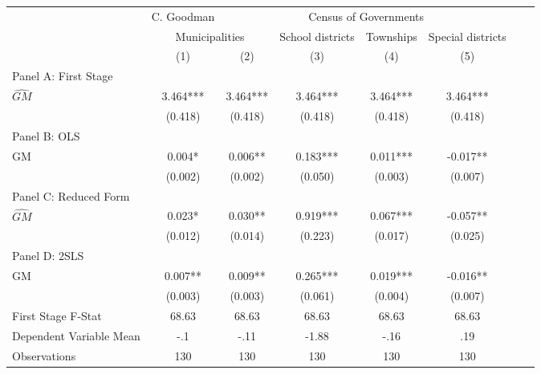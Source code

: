   \begin{tabular}{l*{7}{c}} \toprule
&\multicolumn{1}{c}{C. Goodman}&\multicolumn{4}{c}{Census of Governments}\\\cmidrule(lr){2-2}\cmidrule(lr){3-6}
&\multicolumn{2}{c}{Municipalities}&\multicolumn{1}{c}{School districts}&\multicolumn{1}{c}{Townships}&\multicolumn{1}{c}{Special districts}\\\cmidrule(lr){2-3}\cmidrule(lr){4-6}
&\multicolumn{1}{c}{(1)}&\multicolumn{1}{c}{(2)}&\multicolumn{1}{c}{(3)}&\multicolumn{1}{c}{(4)}&\multicolumn{1}{c}{(5)}\\
\cmidrule(lr){1-6}
\multicolumn{5}{l}{Panel A: First Stage}\\
\cmidrule(lr){1-6}
$\widehat{GM}$  &    3.464***&    3.464***&    3.464***&    3.464***&    3.464***\\
                &  (0.418)   &  (0.418)   &  (0.418)   &  (0.418)   &  (0.418)   \\
\cmidrule(lr){1-6}
\multicolumn{5}{l}{Panel B: OLS}\\
\cmidrule(lr){1-6}
GM              &    0.004*  &    0.006** &    0.183***&    0.011***&   -0.017** \\
                &  (0.002)   &  (0.002)   &  (0.050)   &  (0.003)   &  (0.007)   \\
\cmidrule(lr){1-6}
\multicolumn{5}{l}{Panel C: Reduced Form}\\
\cmidrule(lr){1-6}
$\widehat{GM}$  &    0.023*  &    0.030** &    0.919***&    0.067***&   -0.057** \\
                &  (0.012)   &  (0.014)   &  (0.223)   &  (0.017)   &  (0.025)   \\
\cmidrule(lr){1-6}
\multicolumn{5}{l}{Panel D: 2SLS}\\
\cmidrule(lr){1-6}
GM              &    0.007** &    0.009** &    0.265***&    0.019***&   -0.016** \\
                &  (0.003)   &  (0.003)   &  (0.061)   &  (0.004)   &  (0.007)   \\
\midrule
First Stage F-Stat&    68.63   &    68.63   &    68.63   &    68.63   &    68.63   \\
Dependent Variable Mean&      -.1   &     -.11   &    -1.88   &     -.16   &      .19   \\
Observations    &      130   &      130   &      130   &      130   &      130   \\
       \bottomrule \end{tabular}
